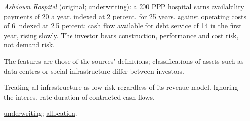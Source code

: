 \begin{qfdefinition}
 \emph{Ashdown Hospital} (original; \hyperref[meth:infrastructure-underwriting]{underwriting}): a 200 PPP hospital earns availability payments of 20 a year, indexed at 2 percent, for 25 years, against operating costs of 6 indexed at 2.5 percent: cash flow available for debt service of 14 in the first year, rising slowly. The investor bears construction, performance and cost risk, not demand risk.

 The features are those of the sources' definitions; classifications of assets such as data centres or social infrastructure differ between investors.

 Treating all infrastructure as low risk regardless of its revenue model. Ignoring the interest-rate duration of contracted cash flows.

 \hyperref[meth:infrastructure-underwriting]{underwriting}; \hyperref[meth:infrastructure-allocation]{allocation}.

\end{qfdefinition}

